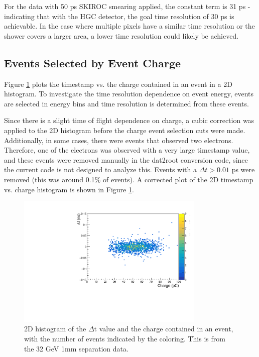 \documentclass[twocolumn,aps,prd,reprint]{revtex4-1}
\begin{document}
For the data with 50 ps SKIROC smearing applied, the constant term is 31 ps - indicating that with the HGC detector, the goal time resolution of 30 ps is achievable. In the case where multiple pixels have a similar time resolution or the shower covers a larger area, a lower time resolution could likely be achieved.

\subsection{Events Selected by Event Charge}

Figure \ref{2D histogram} plots the timestamp vs. the charge contained in an event in a 2D histogram. To investigate the time resolution dependence on event energy, events are selected in energy bins and time resolution is determined from these events.

Since there is a slight time of flight dependence on charge, a cubic correction was applied to the 2D histogram before the charge event selection cuts were made. Additionally, in some cases, there were events that observed two electrons. Therefore, one of the electrons was observed with a very large timestamp value, and these events were removed manually in the dat2root conversion code, since the current code is not designed to analyze this. Events with a $\Delta t > 0.01$ ps were removed (this was around 0.1\% of events). A corrected plot of the 2D timestamp vs. charge histogram is shown in Figure \ref{2D histogram}.

\begin{figure}[!htbp]
\centering
\includegraphics[width = 0.8\textwidth]{32_1mm_2dhist}
\caption{2D histogram of the $\Delta$t value and the charge contained in an event, with the number of events indicated by the coloring. This is from the 32 GeV 1mm separation data.}
\label{2D histogram}
\end{figure}
\end{document}
